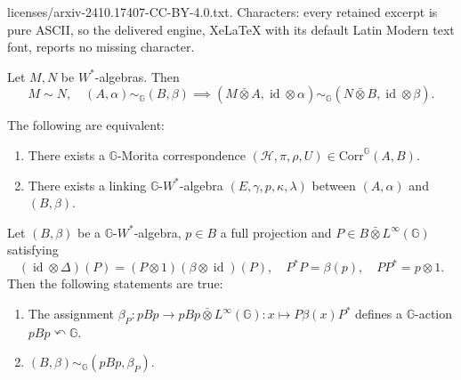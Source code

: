 \documentclass[10pt,a4paper]{amsart}
\DeclareMathOperator{\id}{\mathrm{id}}
\newcommand{\Corr}{\mathrm{Corr}}
\newcommand{\G}{\mathbb{G}}
\newcommand{\ovot}{\bar{\otimes}}
\begin{document}
licenses/arxiv-2410.17407-CC-BY-4.0.txt. Characters: every retained excerpt is pure ASCII, so the delivered engine, XeLaTeX with its default Latin Modern text font, reports no missing character.
\begin{Prop}[Amplification]\label{amplification} Let $M,N$ be $W^*$-algebras. Then
$$M\sim N, \quad (A, \alpha)\sim_\G (B, \beta)\implies (M\ovot A, \id \otimes \alpha)\sim_\G (N \ovot B, \id \otimes \beta).$$
\end{Prop}

\begin{Theorem}\label{char1} 
    The following are equivalent:
    \begin{enumerate}\setlength\itemsep{-0.5em}
        \item There exists a $\G$-Morita correspondence $(\mathcal{H}, \pi, \rho, U)\in \Corr^\G(A,B)$.
        \item There exists a linking $\G$-$W^*$-algebra $(E, \gamma,p, \kappa, \lambda)$ between $(A, \alpha)$ and $(B, \beta)$.
    \end{enumerate}
\end{Theorem}

\begin{Exa}\label{main example}
    Let $(B, \beta)$ be a $\G$-$W^*$-algebra, $p\in B$ a full projection and $P\in B \ovot L^\infty(\G)$ satisfying
    $$(\id \otimes \Delta)(P) = (P\otimes 1) (\beta \otimes \id)(P), \quad P^*P=\beta(p), \quad PP^* = p\otimes 1.$$
    Then the following statements are true:
    \begin{enumerate}\setlength\itemsep{-0.5em}
        \item The assignment  $\beta_P: pBp \to pBp\ovot L^\infty(\G): x \mapsto P\beta(x)P^*$
    defines a $\G$-action $pBp \curvearrowleft \G$. 
    \item $(B, \beta)\sim_\G (pBp, \beta_P).$
    \end{enumerate}
\end{Exa}
\end{document}
